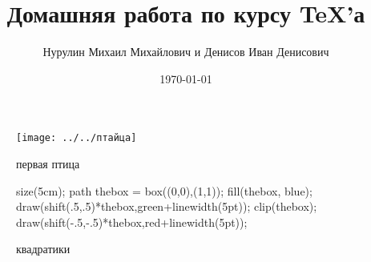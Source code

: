 \documentclass{article}
\title{\bfseries Домашняя работа \textnumero 7 по курсу \TeX'а}
\author{Нурулин Михаил Михайлович и Денисов Иван Денисович}
\date{\today}
\begin{document}
	\maketitle
	\begin{figure}[ht!]
		\centering
		\begin{minipage}{0.45\textwidth}
			\centering
			\texttt{[image: ../../птайца]}
			\caption{первая птица}
		\end{minipage}\hfill
		\begin{minipage}{0.45\textwidth}
			\centering
			\begin{asy}
			size(5cm);
			path thebox = box((0,0),(1,1));
			fill(thebox, blue);
			draw(shift(.5,.5)*thebox,green+linewidth(5pt));
			clip(thebox);
			draw(shift(-.5,-.5)*thebox,red+linewidth(5pt));
			\end{asy}
			\caption{квадратики}
		\end{minipage}
	\end{figure}
\end{document}

